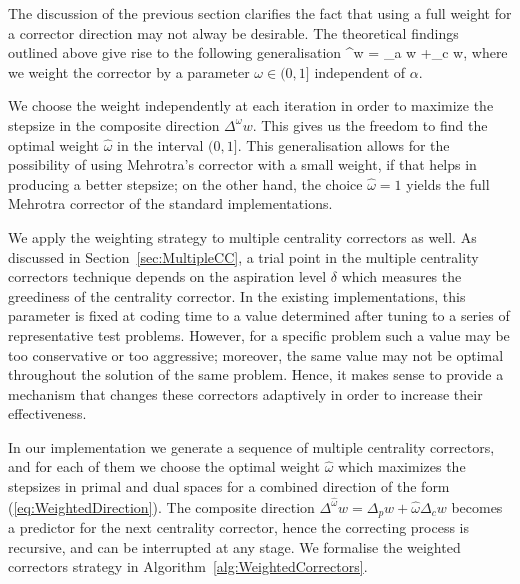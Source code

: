 The discussion of the previous section clarifies the fact that
using a full weight for a corrector direction may not alway be
desirable.
The theoretical findings 
outlined above give rise to the following generalisation
\be  \label{eq:WeightedDirection}
  \Delta^\omega w = \Delta_a w +\omega\Delta_c w,
\ee
where we weight the corrector by a parameter $\omega\in(0,1]$ 
independent of $\alpha$.

We choose the weight independently at each iteration in order 
to maximize the stepsize in the composite direction $\Delta^\omega w$.
This gives us the freedom to find the optimal weight 
$\hat\omega$ in the interval $(0,1]$.
%
This generalisation allows for the possibility of using Mehrotra's 
corrector with a small weight, if that helps in producing a better
stepsize; on the other hand, 
the choice $\hat\omega=1$ yields the full Mehrotra corrector of
the standard implementations. 

We apply the weighting strategy to multiple centrality correctors 
as well. 
As discussed in Section~\ref{sec:MultipleCC}, a trial point 
in the multiple centrality correctors technique depends on the
aspiration level
$\delta$ which measures the greediness of the centrality corrector. 
In the existing implementations, this parameter is fixed at coding time 
to a value determined after tuning to a series of representative 
test problems. However, for a specific problem such a value may be 
too conservative or too aggressive; moreover, the same value may not 
be optimal throughout the solution of the same problem. 
Hence, it makes sense to provide 
a mechanism that changes these correctors adaptively in order 
to increase their effectiveness.

In our implementation we generate a sequence of multiple centrality 
correctors, and for each of them we choose the optimal weight 
$\hat \omega$ which maximizes the stepsizes in primal and dual spaces 
for a combined direction of the form (\ref{eq:WeightedDirection}).
The composite direction 
$\Delta^{\hat\omega} w = \Delta_p w + \hat\omega \Delta_c w$ becomes
a predictor for the next centrality corrector, hence the correcting process
is recursive, and can be interrupted at any stage.
We formalise the weighted correctors strategy in 
Algorithm~\ref{alg:WeightedCorrectors}.

